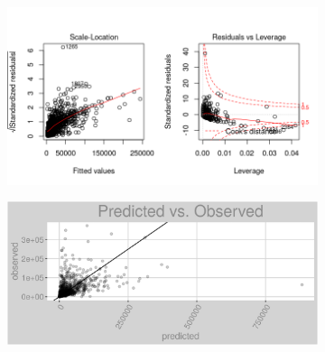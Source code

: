 \begin{figure}[h]
\centering
\begin{subfigure}{1\textwidth}
\centering
\includegraphics[width=.99\textwidth, height=0.475\textheight]{Images/electricity_lp_res_2.png}
\end{subfigure}
\begin{subfigure}{1\textwidth}
\centering
\includegraphics[width=.99\textwidth, height=0.3\textheight]{Images/electricity_lp_pvo.png}
\end{subfigure}
\end{figure}
\newpage
